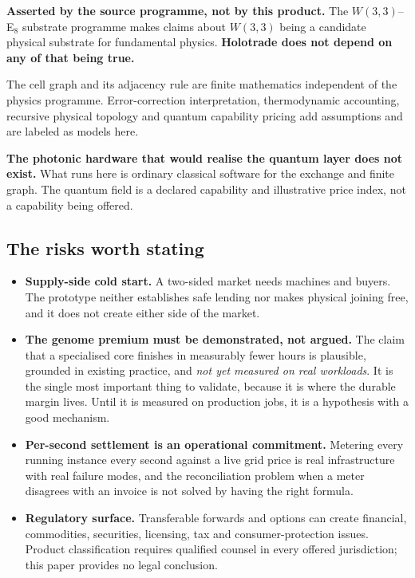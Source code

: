 \documentclass[11pt,letterpaper]{article}
\newcommand{\W}{\ensuremath{W(3,3)}}
\begin{document}
\begin{scopebox}
\textbf{Asserted by the source programme, not by this product.} The \W{}--E$_8$
substrate programme makes claims about \W{} being a candidate physical substrate
for fundamental physics. \textbf{Holotrade does not depend on any of that being
true.}

\vspace{4pt}
The cell graph and its adjacency rule are finite mathematics independent of the
physics programme. Error-correction interpretation, thermodynamic accounting,
recursive physical topology and quantum capability pricing add assumptions and
are labeled as models here.

\vspace{6pt}
\textbf{The photonic hardware that would realise the quantum layer does not
exist.} What runs here is ordinary classical software for the exchange and
finite graph. The quantum field is a declared capability and illustrative price
index, not a capability being offered.
\end{scopebox}

\subsection{The risks worth stating}

\begin{itemize}[leftmargin=1.4em,itemsep=5pt]
\item \textbf{Supply-side cold start.} A two-sided market needs machines and
buyers. The prototype neither establishes safe lending nor makes physical
joining free, and it does not create either side of the market.

\item \textbf{The genome premium must be demonstrated, not argued.} The claim
that a specialised core finishes in measurably fewer hours is plausible,
grounded in existing practice, and \emph{not yet measured on real workloads}.
It is the single most important thing to validate, because it is where the
durable margin lives. Until it is measured on production jobs, it is a
hypothesis with a good mechanism.

\item \textbf{Per-second settlement is an operational commitment.} Metering
every running instance every second against a live grid price is real
infrastructure with real failure modes, and the reconciliation problem when a
meter disagrees with an invoice is not solved by having the right formula.

\item \textbf{Regulatory surface.} Transferable forwards and options can create
financial, commodities, securities, licensing, tax and consumer-protection
issues. Product classification requires qualified counsel in every offered
jurisdiction; this paper provides no legal conclusion.
\end{itemize}
\end{document}

